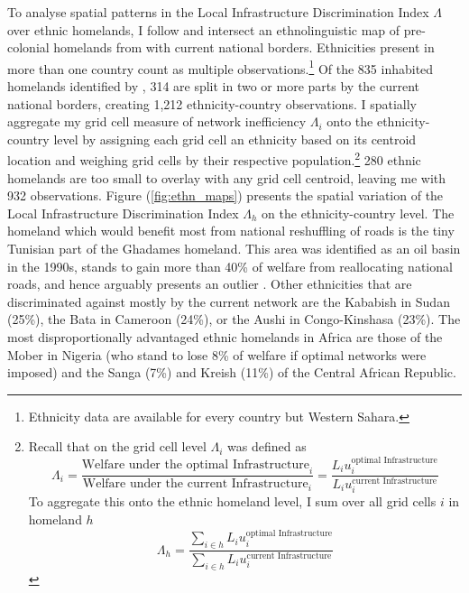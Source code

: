 \documentclass[11pt, oneside]{article}   	%
\let\oldref\ref
\renewcommand{\ref}[1]{(\oldref{#1})}
\begin{document}
To analyse spatial patterns in the Local Infrastructure Discrimination Index $\Lambda$ over ethnic homelands, I follow \cite{michalopoulos_pre-colonial_2013,michalopoulos_national_2014,michalopoulos_long-run_2016} and intersect an ethnolinguistic map of pre-colonial homelands from \cite{Murdock_Africaitspeoples_1959} with current national borders. Ethnicities present in more than one country count as multiple observations.\footnote{Ethnicity data are available for every country but Western Sahara.} Of the 835 inhabited homelands identified by \citeauthor{Murdock_Africaitspeoples_1959}, 314 are split in two or more parts by the current national borders, creating 1,212 ethnicity-country observations. I spatially aggregate my grid cell measure of network inefficiency $\Lambda_{i}$ onto the ethnicity-country level by assigning each grid cell an ethnicity based on its centroid location and weighing grid cells by their respective population.\footnote{Recall that on the grid cell level $\Lambda_{i}$ was defined as \begin{equation*}
  \Lambda_{i} = \frac{\textrm{Welfare under the optimal Infrastructure}_{i}}{\textrm{Welfare under the current Infrastructure}_{i}} = \frac{L_{i}u_{i}^{\textrm{optimal Infrastructure}}}{L_{i}u_{i}^{\textrm{current Infrastructure}}}
\end{equation*} To aggregate this onto the ethnic homeland level, I sum over all grid cells $i$ in homeland $h$ \begin{equation*}
  \Lambda_{h} = \frac{\sum_{i \in h}^{} L_{i}u_{i}^{\textrm{optimal Infrastructure}}}{\sum_{i \in h}^{}L_{i}u_{i}^{\textrm{current Infrastructure}}}
\end{equation*}} 280 ethnic homelands are too small to overlay with any grid cell centroid, leaving me with 932 observations. Figure \ref{fig:ethn_maps} presents the spatial variation of the Local Infrastructure Discrimination Index $\Lambda_{h}$ on the ethnicity-country level. The homeland which would benefit most from national reshuffling of roads is the tiny Tunisian part of the Ghadames homeland. This area was identified as an oil basin in the 1990s, stands to gain more than 40\% of welfare from reallocating national roads, and hence arguably presents an outlier \citep{Echikh_Geologyhydrocarbonoccurrences_1998}. Other ethnicities that are discriminated against mostly by the current network are the Kababish in Sudan (25\%), the Bata in Cameroon (24\%), or the Aushi in Congo-Kinshasa (23\%). The most disproportionally advantaged ethnic homelands in Africa are those of the Mober in Nigeria (who stand to lose 8\% of welfare if optimal networks were imposed) and the Sanga (7\%) and Kreish (11\%) of the Central African Republic.
\end{document}
